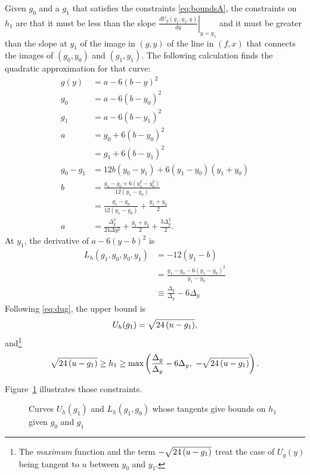 \documentclass[twocolumn]{article}
\begin{document}
Given $g_0$ and a $g_1$ that satisfies the constraints
\eqref{eq:boundsA}, the constraints on $h_1$ are that it must be less
than the slope $\left. \frac{d U_g(g_1,y_1,y)}{dy} \right|_{y=y_1}$
and it must be greater than the slope at $y_1$ of the image in $(g,y)$
of the line in $(f,x)$ that connects the images of $(g_0,y_0)$ and
$(g_1,y_1)$.  The following calculation finds the quadratic
approximation for that curve:
\begin{align*}
  g(y) &= a -6(b-y)^2 \\
  g_0 &= a -6(b-y_0)^2 \\
  g_1 &= a -6(b-y_1)^2 \\
  a &= g_0 + 6(b-y_0)^2 \\
  &=  g_1 + 6(b-y_1)^2 \\
  g_0 -g_1 &= 12b(y_0-y_1) + 6(y_1-y_0)(y_1+y_0) \\
  b &= \frac{g_1-g_0 + 6 (y_1^2-y_0^2)}{12(y_1-y_0)} \\
  &= \frac{g_1 -
    g_0}{12 (y_1 - y_0)} + \frac{y_1 + y_0}{2}\\
  a &= \frac{\Delta_g^2}{24 \Delta y ^2} + \frac{g_1 + g_2}{2} +
  \frac{ 3 \Delta_y^2}{2}.
\end{align*}
At $y_1$, the derivative of $a-6(y-b)^2$ is
\newcommand{\LhQ}{\frac{\Delta_g}{\Delta_y} - 6 \Delta_y}
\begin{align}
  L_h(g_1, g_0, y_0, y_1) &= -12(y_1-b) \nonumber \\
  &= \frac{g_1 - g_0 -6(y_1 - y_0)^2} {y_1-y_0} \nonumber \\
  \label{eq:lower_h}
  & \equiv \LhQ
\end{align}
Following \eqref{eq:dug}, the upper bound is
\newcommand{\Uh}{\Rad{-g_1}}
\begin{equation}
  \label{eq:upper_h}
  U_h(g_1) = \Uh,
\end{equation}
and\footnote{The \emph{maximum} function and the term $-\Uh$ treat the
case of $U_g(y)$ being tangent to $u$ between $y_0$ and $y_1$.}
\begin{equation}
  \label{eq:UL_h}
  \Uh \geq h_1 \geq \text{max}\left( \LhQ,~ -\Uh \right).
\end{equation}

Figure~\ref{fig:boundsC} illustrates those constraints.

\begin{figure}
  \centering
    \caption{Curves $U_h(g_1)$ and $L_h(g_1, g_0)$ whose tangents give
      bounds on $h_1$ given $g_0$ and $g_1$}
  \label{fig:boundsC}
\end{figure}
\end{document}
